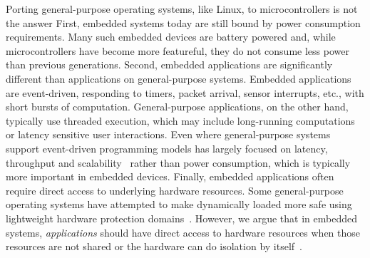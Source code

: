 Porting general-purpose operating systems, like Linux, to microcontrollers is
not the answer First, embedded systems today are still bound by power
consumption requirements. Many such embedded devices are battery powered and,
while microcontrollers have become more featureful, they do not consume less
power than previous generations.  Second, embedded applications are
significantly different than applications on general-purpose systems. Embedded
applications are event-driven, responding to timers, packet arrival, sensor
interrupts, etc., with short bursts of computation. General-purpose
applications, on the other hand, typically use
threaded execution, which may include long-running computations or latency
sensitive user interactions. Even where general-purpose systems support
event-driven programming models has largely focused on
latency, throughput and scalability~\cite{epoll,libasync,ninja} rather than
power consumption, which is typically more important in embedded devices.
Finally, embedded applications often require direct access to underlying
hardware resources. Some general-purpose operating systems have attempted to
make dynamically loaded more safe using lightweight hardware protection
domains~\cite{nooks}. However, we argue that in embedded systems,
\emph{applications} should have direct access to hardware resources when those
resources are not shared or the hardware can do isolation by
itself~\cite{ix:osdi2014}.



